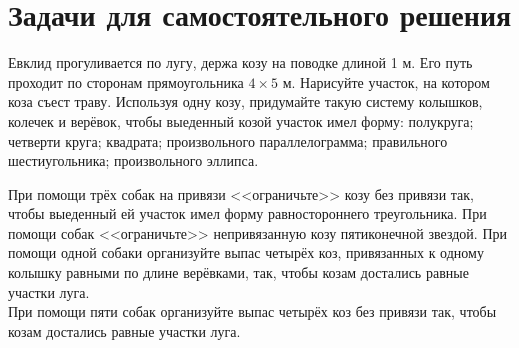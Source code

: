 \documentclass[a4paper,12pt]{article}
\begin{document}
    \section{Задачи для самостоятельного решения}
    \problem Евклид прогуливается по лугу, держа козу на поводке длиной 1 м. Его путь проходит по сторонам прямоугольника $4 \times 5$ м. Нарисуйте участок, на котором коза съест траву.
    \problem Используя одну козу, придумайте такую систему колышков, колечек и верёвок, чтобы выеденный козой участок имел форму: \sub полукруга; \sub четверти круга; \sub квадрата; \sub произвольного параллелограмма; \sub правильного шестиугольника; \sub произвольного эллипса. \\
    \problem При помощи трёх собак на привязи <<ограничьте>> козу без привязи так, чтобы выеденный ей участок имел форму равностороннего треугольника.
    \problem При помощи собак <<ограничьте>> непривязанную козу пятиконечной звездой.
    \problem \sub При помощи одной собаки организуйте выпас четырёх коз, привязанных к одному колышку равными по длине верёвками, так, чтобы козам достались равные участки луга. \\
    \sub При помощи пяти собак организуйте выпас четырёх коз без привязи так, чтобы козам достались равные участки луга. \\
\end{document}
